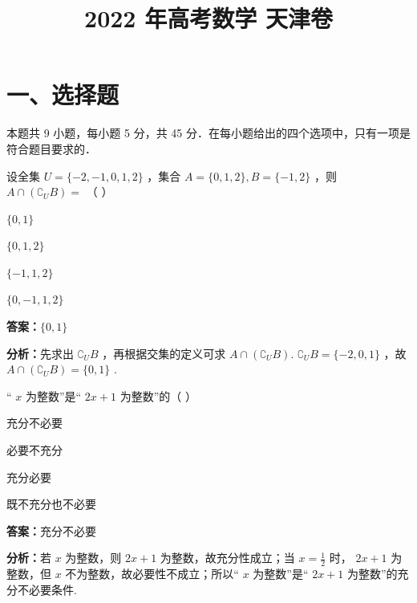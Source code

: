 ﻿\title{2022 年高考数学 天津卷}
\date{}
\maketitle

\section*{一、选择题}
本题共 9 小题，每小题 5 分，共 45 分．在每小题给出的四个选项中，只有一项是符合题目要求的．

\begin{question}[points=5]
设全集 $U = \{-2, -1, 0,1, 2\}$ ，集合 $A = \{0,1, 2\}, B = \{-1, 2\}$ ，则 $A \cap (\complement_U B) =$ （   ）
\begin{choices}
  \item $\{0,1\}$
  \item $\{0,1, 2\}$
  \item $\{-1,1, 2\}$
  \item $\{0, -1,1, 2\}$
\end{choices}
\begin{solution}
\textbf{答案：}$\{0,1\}$

\textbf{分析：}先求出 $\complement_U B$ ，再根据交集的定义可求 $A \cap (\complement_U B)$. $\complement_U B = \{-2, 0,1\}$ ，故 $A \cap (\complement_U B) = \{0,1\}$ .
\end{solution}
\end{question}

\begin{question}[points=5]
“ $x$ 为整数”是“ $2x+1$ 为整数”的（   ）
\begin{choices}
  \item 充分不必要
  \item 必要不充分
  \item 充分必要
  \item 既不充分也不必要
\end{choices}
\begin{solution}
\textbf{答案：}充分不必要

\textbf{分析：}若 $x$ 为整数，则 $2x+1$ 为整数，故充分性成立；当 $x=\frac{1}{2}$ 时， $2x+1$ 为整数，但 $x$ 不为整数，故必要性不成立；所以“ $x$ 为整数”是“ $2x+1$ 为整数”的充分不必要条件.
\end{solution}
\end{question}

